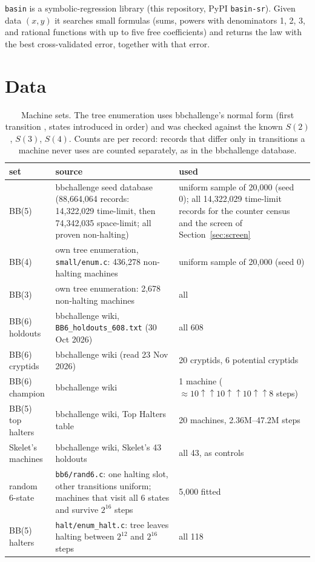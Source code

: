 \documentclass[11pt,a4paper]{article}
\newcommand{\tm}[1]{\texttt{\detokenize{#1}}}   %
\newcommand{\BB}[1]{BB(#1)}
\begin{document}
\texttt{basin} is a symbolic-regression library (this repository, PyPI \texttt{basin-sr}). Given
data $(x, y)$ it searches small formulas (sums, powers with denominators 1, 2, 3, and rational
functions with up to five free coefficients) and returns the law with the best cross-validated
error, together with that error.

\section{Data}

\begin{table}[h]
\centering\small
\begin{tabular}{@{}p{3.0cm}p{6.2cm}p{4.9cm}@{}}
\toprule
set & source & used \\
\midrule
\BB{5} & bbchallenge seed database (88,664,064 records: 14,322,029 time-limit, then 74,342,035
space-limit; all proven non-halting) & uniform sample of 20,000 (seed 0); all 14,322,029
time-limit records for the counter census and the screen of Section~\ref{sec:screen} \\
\BB{4} & own tree enumeration, \texttt{small/enum.c}: 436,278 non-halting machines & uniform sample of 20,000 (seed 0)\\
\BB{3} & own tree enumeration: 2,678 non-halting machines & all \\
\BB{6} holdouts & bbchallenge wiki, \texttt{BB6\_holdouts\_608.txt} (30 Oct 2026) & all 608\\
\BB{6} cryptids & bbchallenge wiki (read 23 Nov 2026) & 20 cryptids, 6 potential cryptids \\
\BB{6} champion & bbchallenge wiki & 1 machine ($\approx 10\uparrow\uparrow10\uparrow\uparrow10\uparrow\uparrow8$ steps)\\
\BB{5} top halters & bbchallenge wiki, Top Halters table & 20 machines, 2.36M--47.2M steps\\
Skelet's machines & bbchallenge wiki, Skelet's 43 holdouts & all 43, as controls\\
random 6-state & \texttt{bb6/rand6.c}: one halting slot, other transitions uniform; machines that visit all 6 states and survive $2^{16}$ steps & 5,000 fitted \\
\BB{5} halters & \texttt{halt/enum\_halt.c}: tree leaves halting between $2^{12}$ and $2^{16}$ steps & all 118 \\
\bottomrule
\end{tabular}
\caption{Machine sets. The tree enumeration uses bbchallenge's normal form (first transition
\tm{1RB}, states introduced in order) and was checked against the known $S(2)$, $S(3)$, $S(4)$.
Counts are per record: records that differ only in transitions a machine never uses are counted
separately, as in the bbchallenge database.}
\label{tab:data}
\end{table}
\end{document}
